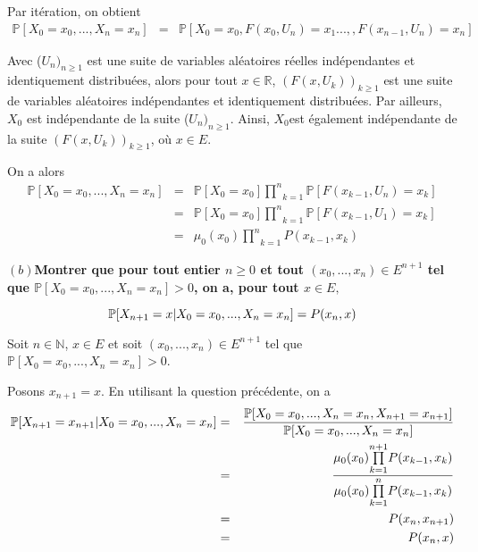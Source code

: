 Par it{\'e}ration, on obtient
\begin{eqnarray*}
  \mathbb{P}[X_0 = x_0, . . ., X_n = x_n] & = & \mathbb{P}[X_0 = x_0, F (x_0,
  U_n) = x_1 . . .,, F (x_{n - 1}, U_n) = x_n]
\end{eqnarray*}


Avec ($U_n)_{n \geqslant 1}$ est une suite de variables al{\'e}atoires
r{\'e}elles ind{\'e}pendantes et identiquement distribu{\'e}es, alors pour
tout $x \in \mathbb{R}$, $(F (x , U_k))_{k \geqslant 1}$ est une suite de
variables al{\'e}atoires ind{\'e}pendantes et identiquement distribu{\'e}es.
Par ailleurs, $X_0$ est ind{\'e}pendante de la suite ($U_n)_{n \geqslant 1}$.
Ainsi, $X_0 $est {\'e}galement ind{\'e}pendante de la suite $(F (x , U_k))_{k
\geqslant 1}$, o{\`u} $x \in E$.

On a alors
\begin{eqnarray*}
  \mathbb{P}[X_0 = x_0, . . ., X_n = x_n] & = & \mathbb{P}[X_0 = x_0]
  \underset{k = 1}{\overset{n}{\prod}} \mathbb{P} [F (x_{k - 1}, U_n) = x_k]\\
  & = & \mathbb{P}[X_0 = x_0] \underset{k = 1}{\overset{n}{\prod}} \mathbb{P}
  [F (x_{k - 1}, U_1) = x_k]\\
  & = & \mu_0 (x_0) \underset{k = 1}{\overset{n}{\prod}} P (x_{k - 1}, x_k)
\end{eqnarray*}


\textbf{$(b)$Montrer que pour tout entier $n \geqslant 0$ et tout
$(x_0, . . ., x_n) \in E^{n + 1}$ tel que $\mathbb{P}[X_0 = x_0, . . ., X_n =
x_n] > 0$, on a, pour tout $x \in E,$}

\[ \mathbb{P}[X_{n + 1} = x |  X_0 = x_0, . . ., X_n = x_n] = P (x_n, x) \]

Soit $n \in \mathbb{N}$, $x \in E$ et soit $(x_0, . . ., x_n) \in E^{n + 1}$
tel que $\mathbb{P}[X_0 = x_0, . . ., X_n = x_n] > 0$.

Posons $x_{n + 1} = x$. En utilisant la question pr{\'e}c{\'e}dente, on a
\begin{eqnarray*}
  \mathbb{P}[X_{n + 1} = x_{n + 1} |  X_0 = x_0, . . ., X_n = x_n] &
  = & \frac{\mathbb{P}[X_0 = x_0, . . ., X_n = x_n, X_{n + 1} = x_{n +
  1}]}{\mathbb{P}[X_0 = x_0, . . ., X_n = x_n]}\\
  & = & \frac{\mu_0 (x_0) \underset{k = 1}{\overset{n + 1}{\prod}} P (x_{k -
  1}, x_k)}{\mu_0 (x_0) \underset{k = 1}{\overset{n}{\prod}} P (x_{k - 1},
  x_k)}\\
  & = & P (x_n, x_{n + 1})\\
  & = & P (x_n, x)
\end{eqnarray*}


